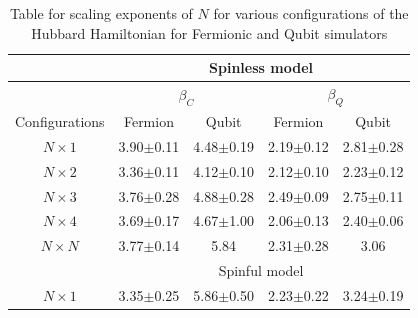\documentclass[aps, prx, reprint, superscriptaddress]{revtex4-2}
\begin{document}
\begin{table}[]
\begin{tabular}{|c|cccc|}
\hline
                                   & \multicolumn{4}{c|}{{\color[HTML]{000000} Spinless model}}                                                                                        \\ \hline
                                   & \multicolumn{2}{c|}{$\beta_C$}                                              & \multicolumn{2}{c|}{$\beta_Q$}                                              \\ \hline
Configurations                           & \multicolumn{1}{c|}{Fermion}       & \multicolumn{1}{c|}{Qubit}         & \multicolumn{1}{c|}{Fermion}       & Qubit                              \\ \hline
$N \times 1$                       & \multicolumn{1}{c|}{3.90$\pm$0.11} & \multicolumn{1}{c|}{4.48$\pm$0.19} & \multicolumn{1}{c|}{2.19$\pm$0.12} & 2.81$\pm$0.28                      \\ \hline
$N \times 2$                       & \multicolumn{1}{c|}{3.36$\pm$0.11} & \multicolumn{1}{c|}{4.12$\pm$0.10} & \multicolumn{1}{c|}{2.12$\pm$0.10} & 2.23$\pm$0.12                      \\ \hline
$N \times 3$                       & \multicolumn{1}{c|}{3.76$\pm$0.28} & \multicolumn{1}{c|}{4.88$\pm$0.28} & \multicolumn{1}{c|}{2.49$\pm$0.09} & 2.75$\pm$0.11                      \\ \hline
$N \times 4$                       & \multicolumn{1}{c|}{3.69$\pm$0.17} & \multicolumn{1}{c|}{4.67$\pm$1.00} & \multicolumn{1}{c|}{2.06$\pm$0.13} & 2.40$\pm$0.06                      \\ \hline
$N \times N$                       & \multicolumn{1}{c|}{3.77$\pm$0.14} & \multicolumn{1}{c|}{5.84}          & \multicolumn{1}{c|}{2.31$\pm$0.28} & 3.06                               \\ \hline
\multicolumn{1}{|l|}{}             & \multicolumn{4}{c|}{Spinful model}                                                                                                                \\ \hline
$N \times 1$ & \multicolumn{1}{l|}{3.35$\pm$0.25} & \multicolumn{1}{l|}{5.86$\pm$0.50} & \multicolumn{1}{l|}{2.23$\pm$0.22} & \multicolumn{1}{l|}{3.24$\pm$0.19} \\ \hline
\end{tabular}
\caption{Table for scaling exponents of $N$ for various configurations of the Hubbard Hamiltonian for Fermionic and Qubit simulators}
\label{table:scalability}
\end{table}
\end{document}
